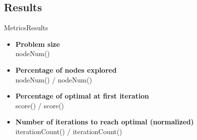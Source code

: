 \subsection{Results}

\begin{frame}{Metrics}{Results}

\begin{itemize}
\item \textcolor{metric-PR}{\textbf{Problem size}} \\
nodeNum() 
\bigskip
\item \textcolor{metric-NE}{\textbf{Percentage of nodes explored}}
\\
nodeNum() / nodeNum()
\bigskip
\item \textcolor{metric-OFI}{\textbf{Percentage of optimal at first iteration}}
\\
score() / score()
\bigskip
\item \textcolor{metric-IRO}{\textbf{Number of iterations to reach optimal (normalized)}}
\\
iterationCount() / iterationCount()
\end{itemize}

\end{frame}


